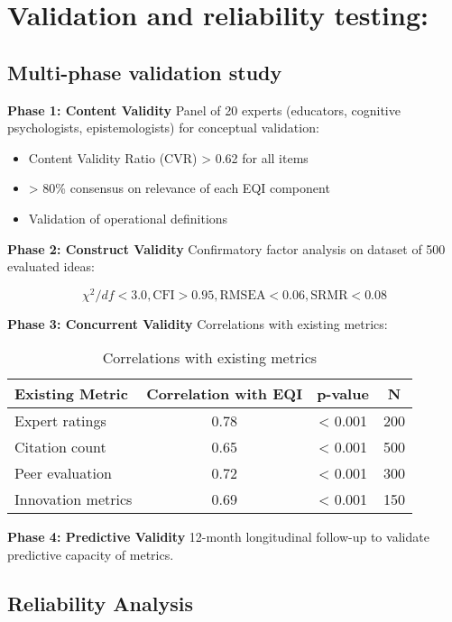 \section{Validation and reliability testing:}
\subsection*{Multi-phase validation study}

\textbf{Phase 1: Content Validity}
Panel of 20 experts (educators, cognitive psychologists, epistemologists) for conceptual validation:
\begin{itemize}
	\item Content Validity Ratio (CVR) > 0.62 for all items
	\item > 80\% consensus on relevance of each EQI component
	\item Validation of operational definitions
\end{itemize}

\textbf{Phase 2: Construct Validity}  
Confirmatory factor analysis on dataset of 500 evaluated ideas:

\begin{equation}
	\chi^2/df < 3.0, \text{CFI} > 0.95, \text{RMSEA} < 0.06, \text{SRMR} < 0.08
	\label{eq:fit-indices}
\end{equation}

\textbf{Phase 3: Concurrent Validity}
Correlations with existing metrics:

\begin{table}[h]
	\centering
	\caption{Correlations with existing metrics}
	\label{tab:concurrent-validity}
	\begin{tabular}{lccc}
		\toprule
		\textbf{Existing Metric} & \textbf{Correlation with EQI} & \textbf{p-value} & \textbf{N} \\
		\midrule
		Expert ratings & 0.78 & < 0.001 & 200 \\
		Citation count & 0.65 & < 0.001 & 500 \\
		Peer evaluation & 0.72 & < 0.001 & 300 \\
		Innovation metrics & 0.69 & < 0.001 & 150 \\
		\bottomrule
	\end{tabular}
\end{table}

\textbf{Phase 4: Predictive Validity}
12-month longitudinal follow-up to validate predictive capacity of metrics.

\subsection{Reliability Analysis}

